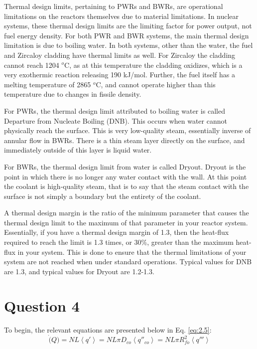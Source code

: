 \documentclass{article}
\begin{document}
Thermal design limits, pertaining to PWRs and BWRs, are operational limitations on the reactors themselves due to material limitations. In nuclear systems, these thermal design limits are the limiting factor for power output, not fuel energy density. For both PWR and BWR systems, the main thermal design limitation is due to boiling water.  In both systems, other than the water, the fuel and Zircaloy cladding have thermal limits as well. For Zircaloy the cladding cannot reach 1204 $^o$C, as at this temperature the cladding oxidizes, which is a very exothermic reaction releasing 190 kJ/mol. Further, the fuel itself has a melting temperature of 2865 $^o$C, and cannot operate higher than this temperature due to changes in fissile density.  

For PWRs, the thermal design limit attributed to boiling water is called Departure from Nucleate Boiling (DNB). This occurs when water cannot physically reach the surface. This is very low-quality steam, essentially inverse of annular flow in BWRs. There is a thin steam layer directly on the surface, and immediately outside of this layer is liquid water.

For BWRs, the thermal design limit from water is called Dryout. Dryout is the point in which there is no longer any water contact with the wall. At this point the coolant is high-quality steam, that is to say that the steam contact with the surface is not simply a boundary but the entirety of the coolant. 

A thermal design margin is the ratio of the minimum parameter that causes the thermal design limit to the maximum of that parameter in your reactor system. Essentially, if you have a thermal design margin of 1.3, then the heat-flux required to reach the limit is 1.3 times, or 30\%, greater than the maximum heat-flux in your system. This is done to ensure that the thermal limitations of your system are not reached when under standard operations. Typical values for DNB are 1.3, and typical values for Dryout are 1.2-1.3. 

\newpage
\section*{Question 4}

To begin, the relevant equations are presented below in Eq. \ref{eq:2.5}:
\begin{equation}
    \Dot(Q) = NL \left< q' \right> = NL\pi D_{co} \left< q''_{co}\right> = NL\pi R_{fo}^2 \left< q''' \right>
    \label{eq:2.5}
\end{equation}
\end{document}
